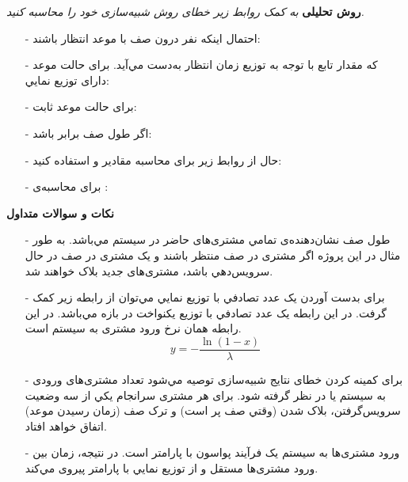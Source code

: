 \documentclass[12pt]{article}
\begin{document}
    \newpage
    \textbf{روش تحلیلی}
    \newline
    \textit{به‌ کمک روابط زیر خطای روش شبیه‌سازی خود را محاسبه کنید.}
    \begin{itemize}
	\item[-]
	احتمال اینکه  نفر درون صف  با موعد انتظار باشند:
    \lr{\[
	P_n =
	\begin{cases}
	    P_0(\frac{\lambda}{\mu}),
		&\quad\text{n = 1} \\
		P_0\lambda^n\frac{\varphi_{n-1}(\mu)}{(n-1)!},
		&\quad\text{n > 1}
	\end{cases}
	\]}
    
    \item[-]
	که مقدار تابع  با توجه به توزیع زمان انتظار به‌دست مي‌آید. برای حالت موعد دارای توزیع نمایي:
    \lr{\[
	\varphi_n(\mu) = \frac{n!}{\prod_{i=0}^{n} (\mu + i/\bar\theta)}
	\]}
    \item[-]
	برای حالت موعد ثابت:
    \lr{\[
	\varphi_n(\mu) = \frac{n!}{\mu^{n+1}}(1 - e^{-\mu\bar\theta}\sum_{i=0}^{n-1} \frac{(\mu\bar\theta)^i}{i!})
	\]}
    \item[-]
	اگر طول صف برابر  باشد:
    \lr{\[
    \sum_{i=0}^{K} P_i = 1
	\]}
    \item[-]
	حال از روابط زیر برای محاسبه مقادیر  و  استفاده کنید:
    \lr{\[
    P_b = P_K
    \]
    \[
    P_d + P_b = 1 - \frac{\mu}{\lambda}(\sum_{i=1}^{K} P_i) = 1 - \frac{\mu}{\lambda}(1 - P_0)
	\]}
    \item[-]
	برای محاسبه‌ی  :
    \lr{\[
    N_c = \sum_{i=1}^{K} (i.P_i)
    \]}
	\end{itemize}
	
	\newpage
    \textbf{نکات و سوالات متداول}
    \begin{itemize}
	\item[-]
	طول صف نشان‌دهنده‌ی تمامي مشتری‌های حاضر در سیستم مي‌باشد. به طور مثال در این پروژه اگر  مشتری در صف
منتظر باشند و یک مشتری در صف در حال سرویس‌دهي باشد، مشتری‌های جدید بلاک خواهند شد. 
	\item[-]
برای بدست آوردن یک عدد تصادفي با توزیع نمایي مي‌توان از رابطه زیر کمک گرفت. در این رابطه  یک عدد تصادفي با
توزیع یکنواخت  در بازه \lr{$[0,1)$} مي‌باشد. در این رابطه \lr{$\lambda$} همان نرخ ورود مشتری به سیستم است. 
    \[
    y = - \frac{\ln(1 - x)}{\lambda}
    \]
    \item[-]
برای کمینه کردن خطای نتایج شبیه‌سازی توصیه مي‌شود تعداد مشتری‌های ورودی به سیستم  یا  در نظر گرفته
شود. برای هر مشتری سرانجام یکي از سه وضعیت سرویس‌گرفتن، بلاک شدن (وقتي صف پر است) و ترک صف (زمان  رسیدن موعد) اتفاق خواهد افتاد.
	\item[-]
ورود مشتری‌ها به سیستم یک فرآیند پواسون با پارامتر \lr{$\lambda$} است. در نتیجه، زمان بین ورود مشتری‌ها مستقل و از توزیع
نمایي با پارامتر \lr{$\lambda$} پیروی مي‌کند. 
	\end{itemize}
	
\end{document}
